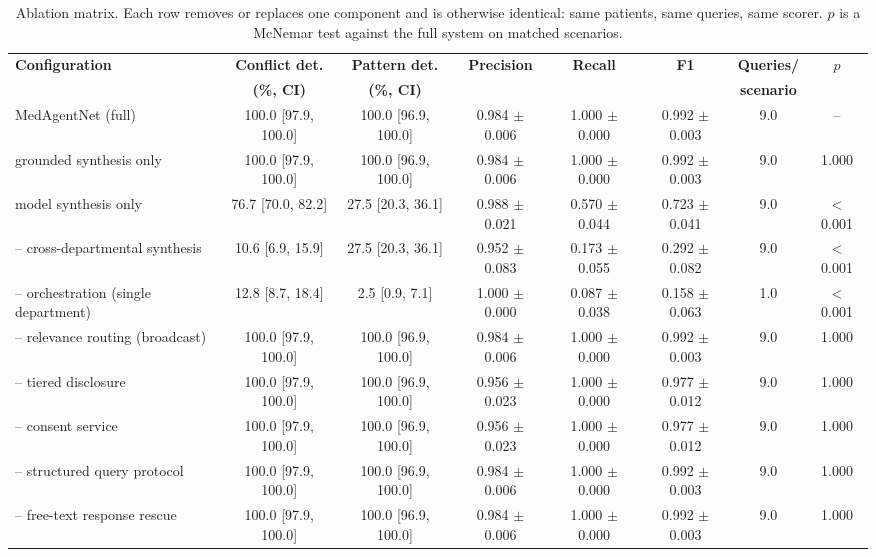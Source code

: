 \begin{table}[!t]
\centering
\caption{Ablation matrix. Each row removes or replaces one component and is otherwise identical: same patients, same queries, same scorer. $p$ is a McNemar test against the full system on matched scenarios.}
\label{tab:r1_ablation}
\small
\begin{tabular}{lccccccc}
\toprule
\textbf{Configuration} & \textbf{Conflict det.} & \textbf{Pattern det.} & \textbf{Precision} & \textbf{Recall} & \textbf{F1} & \textbf{Queries/} & \textbf{$p$} \\
 & \textbf{(\%, CI)} & \textbf{(\%, CI)} & & & & \textbf{scenario} & \\
\midrule
MedAgentNet (full) & 100.0 [97.9, 100.0] & 100.0 [96.9, 100.0] & 0.984 $\pm$ 0.006 & 1.000 $\pm$ 0.000 & 0.992 $\pm$ 0.003 & 9.0 & -- \\
\quad grounded synthesis only & 100.0 [97.9, 100.0] & 100.0 [96.9, 100.0] & 0.984 $\pm$ 0.006 & 1.000 $\pm$ 0.000 & 0.992 $\pm$ 0.003 & 9.0 & 1.000 \\
\quad model synthesis only & 76.7 [70.0, 82.2] & 27.5 [20.3, 36.1] & 0.988 $\pm$ 0.021 & 0.570 $\pm$ 0.044 & 0.723 $\pm$ 0.041 & 9.0 & $<$0.001 \\
-- cross-departmental synthesis & 10.6 [6.9, 15.9] & 27.5 [20.3, 36.1] & 0.952 $\pm$ 0.083 & 0.173 $\pm$ 0.055 & 0.292 $\pm$ 0.082 & 9.0 & $<$0.001 \\
-- orchestration (single department) & 12.8 [8.7, 18.4] & 2.5 [0.9, 7.1] & 1.000 $\pm$ 0.000 & 0.087 $\pm$ 0.038 & 0.158 $\pm$ 0.063 & 1.0 & $<$0.001 \\
-- relevance routing (broadcast) & 100.0 [97.9, 100.0] & 100.0 [96.9, 100.0] & 0.984 $\pm$ 0.006 & 1.000 $\pm$ 0.000 & 0.992 $\pm$ 0.003 & 9.0 & 1.000 \\
-- tiered disclosure & 100.0 [97.9, 100.0] & 100.0 [96.9, 100.0] & 0.956 $\pm$ 0.023 & 1.000 $\pm$ 0.000 & 0.977 $\pm$ 0.012 & 9.0 & 1.000 \\
-- consent service & 100.0 [97.9, 100.0] & 100.0 [96.9, 100.0] & 0.956 $\pm$ 0.023 & 1.000 $\pm$ 0.000 & 0.977 $\pm$ 0.012 & 9.0 & 1.000 \\
-- structured query protocol & 100.0 [97.9, 100.0] & 100.0 [96.9, 100.0] & 0.984 $\pm$ 0.006 & 1.000 $\pm$ 0.000 & 0.992 $\pm$ 0.003 & 9.0 & 1.000 \\
-- free-text response rescue & 100.0 [97.9, 100.0] & 100.0 [96.9, 100.0] & 0.984 $\pm$ 0.006 & 1.000 $\pm$ 0.000 & 0.992 $\pm$ 0.003 & 9.0 & 1.000 \\
\bottomrule
\end{tabular}
\end{table}


